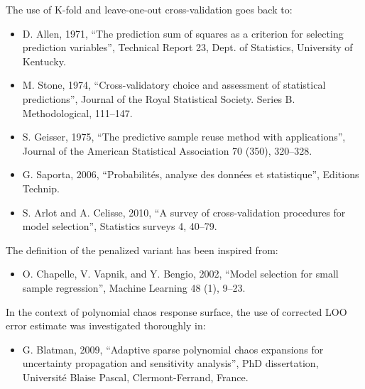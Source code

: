             {
              The use of K-fold and leave-one-out cross-validation goes back to:
              \begin{itemize}
              \item D. Allen, 1971, ``The prediction sum of squares as a criterion for selecting prediction variables'', Technical Report 23, Dept. of Statistics, University of Kentucky.
              \end{itemize}
              \begin{itemize}
              \item M. Stone, 1974, ``Cross-validatory choice and assessment of statistical predictions'', Journal of the Royal Statistical Society. Series B.
  Methodological, 111--147.
              \end{itemize}
              \begin{itemize}
              \item S. Geisser, 1975, ``The predictive sample reuse method with applications'', Journal of the American Statistical Association 70 (350), 320--328.
              \end{itemize}
              \begin{itemize}
              \item G. Saporta, 2006, ``Probabilit\'{e}s, analyse des donn\'{e}es et statistique'', Editions Technip.
              \end{itemize}
              \begin{itemize}
              \item S. Arlot and A. Celisse, 2010, ``A survey of cross-validation procedures for model selection'', Statistics surveys 4, 40--79.
              \end{itemize}
              The definition of the penalized variant has been inspired from:
              \begin{itemize}
              \item O. Chapelle, V. Vapnik, and Y. Bengio, 2002, ``Model selection for small sample regression'', Machine Learning 48 (1), 9--23.
              \end{itemize}
              In the context of polynomial chaos response surface, the use of corrected LOO error estimate was investigated thoroughly in:
              \begin{itemize}
              \item G. Blatman, 2009, ``Adaptive sparse polynomial chaos expansions for uncertainty propagation and sensitivity analysis'', PhD dissertation, Universit\'e Blaise Pascal, Clermont-Ferrand, France.
              \end{itemize}
            }

